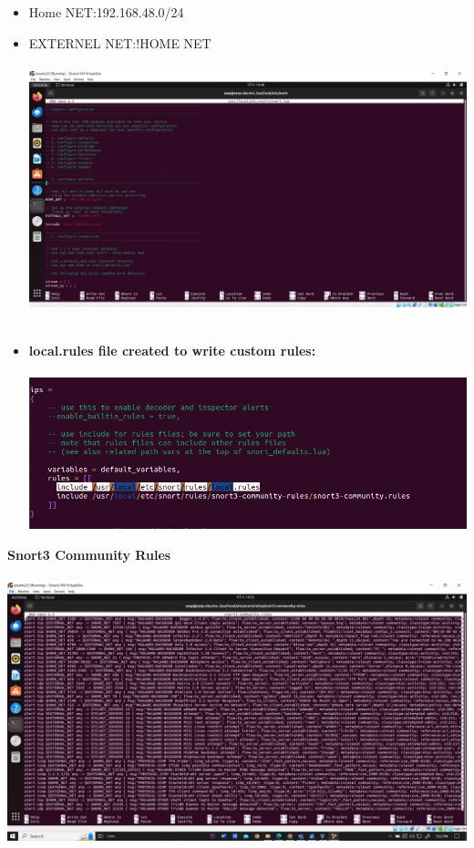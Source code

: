 \documentclass{article}
\begin{document}
\begin{itemize}
    \item Home NET:192.168.48.0/24
    \item EXTERNEL NET:!HOME NET\\\\
    \includegraphics[width=1.0\textwidth]{images/configuration.PNG}\\\\
    \item \textbf{local.rules file created to write custom rules:}\\\\
    \includegraphics[width=1.0\textwidth]{images/local_rules_file.PNG}
\end{itemize}
\clearpage
\textbf{\hspace{-\3.5cm}Snort3 Community Rules}\\\\
\includegraphics[width=1.0\textwidth]{images/community_rules.PNG}\\\\
\end{document}
